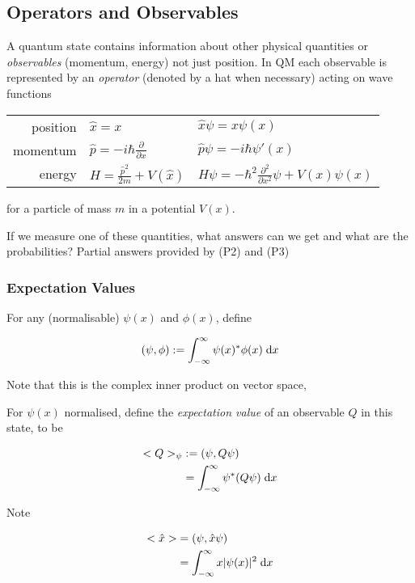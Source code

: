 \documentclass[a4paper]{article}
\begin{document}
\subsection{Operators and Observables}

A quantum state contains information about other physical quantities or \emph{observables} (momentum, energy) not just position. In QM each observable is represented by an \emph{operator} (denoted by a hat when necessary) acting on wave functions

\begin{center}
	\begin{tabular}{rll}
		position & $\hat{x} = x$ & $\hat{x} \psi = x\psi(x)$\\
		momentum & $\hat{p} = -i\hbar \frac{\partial}{\partial x}$ & $\hat{p}\psi = -i\hbar \psi'(x)$\\
		energy & $H = \frac{\hat{p}^2}{2m} + V(\hat{x})$ & $H\psi = -\hbar^2 \frac{\partial^2}{\partial x^2}\psi + V(x)\psi(x)$
	\end{tabular}
\end{center}

for a particle of mass $ m $ in a potential $ V(x) $.

If we measure one of these quantities, what answers can we get and what are the probabilities? Partial answers provided by (P2) and (P3)

\subsubsection{Expectation Values}

For any (normalisable) $ \psi(x) $ and $ \phi(x) $, define 

\[ (\psi,\phi) : = \int_{-\infty}^{\infty} \psi(x)^{*}\phi(x) \; \mathrm{d} x \]

Note that this is the complex inner product on vector space,

For $ \psi(x) $ normalised, define the \emph{expectation value} of an observable $ Q $ in this state, to be

\begin{align*}
	<Q>_{\psi}& : = (\psi, Q \psi) \\
	& = \int_{-\infty}^{\infty} \psi^{*} (Q \psi) \; \mathrm{d} x
\end{align*} 

Note

\begin{align*}
	<\hat{x}>  & =  (\psi, \hat{x} \psi) \\
	& =  \int_{-\infty}^{\infty} x | \psi(x) |^{2} \; \mathrm{d} x
\end{align*}
\end{document}
